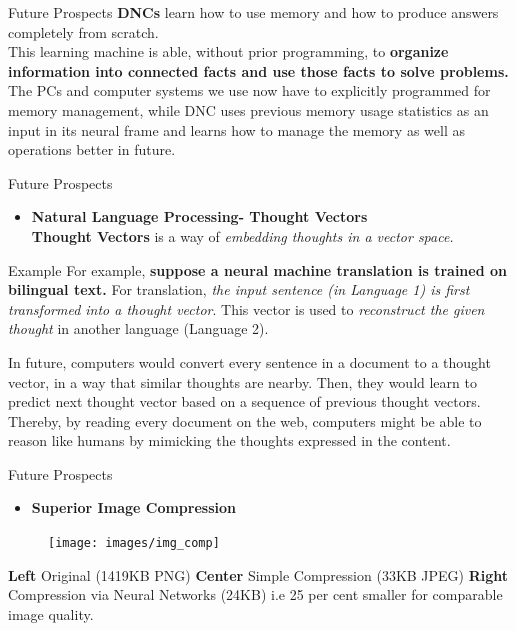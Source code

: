 \documentclass[10pt]{beamer}
\begin{document}
	\begin{frame}[c]{Future Prospects}
	\large{\textbf{DNCs} learn how to use memory and how to produce answers completely from scratch.
	\\
	This learning machine is able, without prior programming, to \textbf{organize information into connected facts and use those facts to solve problems.}
	\\
	\bigskip
 	The PCs and computer systems we use now have to explicitly programmed for memory management, while DNC uses previous memory usage statistics as an input in its neural frame and learns how to manage the memory as well as operations better in future.
 	}
	\end{frame}
	\begin{frame}[c]{Future Prospects}
		\begin{itemize}
			\item \large{\textbf{Natural Language Processing- Thought Vectors}}
			\\
			\bigskip
			\textbf{Thought Vectors} is a way of \textit{\alert{embedding thoughts in a vector space.}}
		\end{itemize}
		\begin{block}{Example}
			For example, \textbf{suppose a neural machine translation is trained on bilingual text.} For translation, \textit{\alert{the input sentence (in Language 1) is first transformed into a thought vector}}. This vector is used to \textit{\alert{reconstruct the given thought}} in another language (Language 2).
		\end{block}
				In future, computers would convert every sentence in a document to a thought vector, in a way that similar thoughts are nearby. Then, they would learn to predict next thought vector based on a sequence of previous thought vectors. Thereby, by reading every document on the web, computers might be able to reason like humans by mimicking the thoughts expressed in the content.
	\end{frame}
	\begin{frame}[c]{Future Prospects}
		\begin{itemize}
		\item \large{\textbf{Superior Image Compression}}
		\end{itemize}
		\begin{figure}
			\texttt{[image: images/img\_comp]}
		\end{figure}
		\textbf{Left} Original (1419KB PNG) \textbf{Center} Simple Compression (33KB JPEG) \textbf{Right} Compression via Neural Networks (24KB)
		\alert{i.e 25 per cent smaller} for comparable image quality.
	\end{frame}
\end{document}
